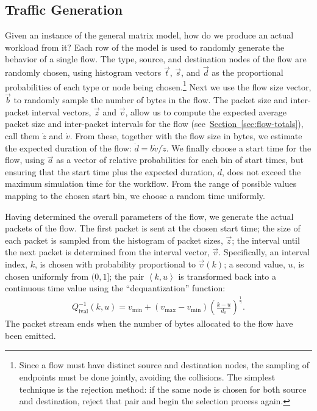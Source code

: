 \documentclass[twocolumn,final]{svjour3}
\newcommand{\Section}[1]{\hyperref[sec:#1]{Section~\ref*{sec:#1}}}
\newcommand{\Di}{Q^{-1}_{\text{ival}}}
\newcommand{\seq}[1]{\left<#1\right>}
\newcommand{\fracx}[2]{#1/#2}
\begin{document}
\subsection{Traffic Generation}
\label{sec:traffic-generation}

Given an instance of the general matrix model, how do we produce an actual workload from it? Each row of the model is used to randomly generate the behavior of a single flow. The type, source, and destination nodes of the flow are randomly chosen, using histogram vectors $\vec{t}$, $\vec{s}$, and $\vec{d}$ as the proportional probabilities of each type or node being chosen.\footnote{Since a flow must have distinct source and destination nodes, the sampling of endpoints must be done jointly, avoiding the collisions. The simplest technique is the rejection method: if the same node is chosen for both source and destination, reject that pair and begin the selection process again.}
Next we use the flow size vector, $\vec{b}$ to randomly sample the number of bytes in the flow. The packet size and inter-packet interval vectors, $\vec{z}$ and $\vec{v}$, allow us to compute the expected average packet size and inter-packet intervals for the flow (see~\Section{flow-totals}), call them $\dot{z}$ and $\dot{v}$. From these, together with the flow size in bytes, we estimate the expected duration of the flow: $\dot{d} = \fracx{b\dot{v}}{\dot{z}}$. We finally choose a start time for the flow, using $\vec{a}$ as a vector of relative probabilities for each bin of start times, but ensuring that the start time plus the expected duration, $\dot{d}$, does not exceed the maximum simulation time for the workflow. From the range of possible values mapping to the chosen start bin, we choose a random time uniformly.

Having determined the overall parameters of the flow, we generate the actual packets of the flow. The first packet is sent at the chosen start time; the size of each packet is sampled from the histogram of packet sizes, $\vec{z}$; the interval until the next packet is determined from the interval vector, $\vec{v}$. Specifically, an interval index, $k$, is chosen with probability proportional to $\vec{v}(k)$; a second value, $u$, is chosen uniformly from $(0,1]$; the pair $\seq{k,u}$ is transformed back into a continuous time value using the ``dequantization'' function:
\begin{align}
\label{eqn:interval-dequantization}
\Di(k,u)=v_{\min}+(v_{\max}-v_{\min})\left(\frac{k-u}{d_v}\right)^{\frac{1}{\gamma}}.
\end{align}
The packet stream ends when the number of bytes allocated to the flow have been emitted. %
\end{document}
